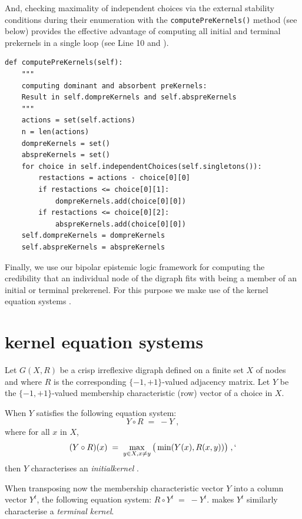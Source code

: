 And, checking maximality of independent choices via the external stability conditions during their enumeration with the \texttt{computePreKernels()} method (see below) provides the effective advantage of computing all initial and terminal prekernels in a single loop (see Line 10 and \citep{BIS-2006b}).
\begin{lstlisting}[caption={Computing dominant and absorbent preKernels},label=list:17.1]
def computePreKernels(self):
    """
    computing dominant and absorbent preKernels:
    Result in self.dompreKernels and self.abspreKernels
    """
    actions = set(self.actions)
    n = len(actions)
    dompreKernels = set()
    abspreKernels = set()
    for choice in self.independentChoices(self.singletons()):
        restactions = actions - choice[0][0]
        if restactions <= choice[0][1]:
            dompreKernels.add(choice[0][0])
        if restactions <= choice[0][2]:
            abspreKernels.add(choice[0][0])
    self.dompreKernels = dompreKernels
    self.abspreKernels = abspreKernels
\end{lstlisting}
 
Finally, we use our bipolar epistemic logic framework for computing the credibility that an individual node of the digraph fits with being a member of an initial or terminal prekerenel. For this purpose we make use of the \Berge kernel equation systems \citep{BER-1958}.

\section{\Berge kernel equation systems}
\label{sec:17.6}

Let $G(X,R)$ be a crisp irreflexive digraph defined on a finite set $X$ of nodes and where $R$ is the corresponding $\{-1,+1\}$-valued adjacency matrix. Let $Y$ be the $\{-1,+1\}$-valued membership characteristic (row) vector of a choice in $X$.

When $Y$ satisfies the following equation system:
\begin{equation}
  Y \circ R \; = \; -Y\;,
\end{equation}
where for all $x$ in $X$,
\begin{equation}\label{eq:17.2}
     (Y \circ R)(x) \; = \; \max_{y \in X, x \neq y} \big ( \min(Y(x), R(x,y))\big)\;,`
\end{equation}
then $Y$ characterises an \emph{initialkernel} \citep{BER-1958}.

When transposing now the membership characteristic vector $Y$ into a column vector $Y^t$, the following equation system: $R \circ Y^t \; = \; -Y^t$.
makes $Y^t$ similarly characterise a \emph{terminal kernel}.


